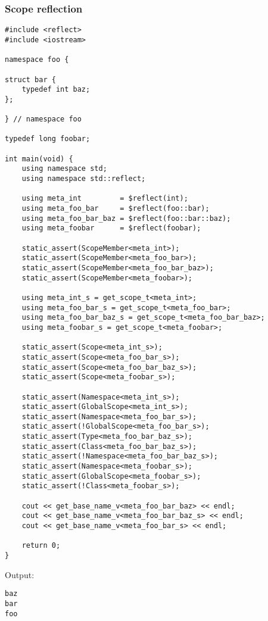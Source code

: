 \subsubsection{Scope reflection}

\begin{verbatim}
#include <reflect>
#include <iostream>

namespace foo {

struct bar {
	typedef int baz;
};

} // namespace foo

typedef long foobar;

int main(void) {
	using namespace std;
	using namespace std::reflect;

	using meta_int         = $reflect(int);
	using meta_foo_bar     = $reflect(foo::bar);
	using meta_foo_bar_baz = $reflect(foo::bar::baz);
	using meta_foobar      = $reflect(foobar);

	static_assert(ScopeMember<meta_int>);
	static_assert(ScopeMember<meta_foo_bar>);
	static_assert(ScopeMember<meta_foo_bar_baz>);
	static_assert(ScopeMember<meta_foobar>);

	using meta_int_s = get_scope_t<meta_int>;
	using meta_foo_bar_s = get_scope_t<meta_foo_bar>;
	using meta_foo_bar_baz_s = get_scope_t<meta_foo_bar_baz>;
	using meta_foobar_s = get_scope_t<meta_foobar>;

	static_assert(Scope<meta_int_s>);
	static_assert(Scope<meta_foo_bar_s>);
	static_assert(Scope<meta_foo_bar_baz_s>);
	static_assert(Scope<meta_foobar_s>);

	static_assert(Namespace<meta_int_s>);
	static_assert(GlobalScope<meta_int_s>);
	static_assert(Namespace<meta_foo_bar_s>);
	static_assert(!GlobalScope<meta_foo_bar_s>);
	static_assert(Type<meta_foo_bar_baz_s>);
	static_assert(Class<meta_foo_bar_baz_s>);
	static_assert(!Namespace<meta_foo_bar_baz_s>);
	static_assert(Namespace<meta_foobar_s>);
	static_assert(GlobalScope<meta_foobar_s>);
	static_assert(!Class<meta_foobar_s>);

	cout << get_base_name_v<meta_foo_bar_baz> << endl;
	cout << get_base_name_v<meta_foo_bar_baz_s> << endl;
	cout << get_base_name_v<meta_foo_bar_s> << endl;

	return 0;
}
\end{verbatim}

Output:

\begin{verbatim}
baz
bar
foo
\end{verbatim}

